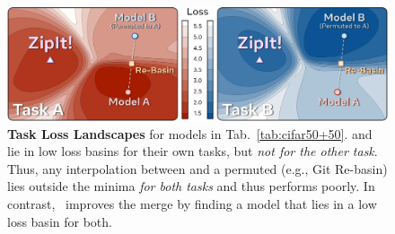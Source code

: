 



\begin{figure}
  \centering
  \includegraphics[width=\linewidth]{figures/imgs/loss_landscapes.png}
  \caption{{\bf Task Loss Landscapes} for models in Tab.~\ref{tab:cifar50+50}. %
   and  lie in low loss basins for their own tasks, but \textit{not for the other task}.
  Thus, any interpolation between  and a permuted  (e.g., Git Re-basin) lies outside the minima \textit{for both tasks} and thus performs poorly. In contrast, \name{}\ improves the merge by finding a model that lies in a low loss basin for both.
  }
  \label{fig:loss_basin}
\end{figure}